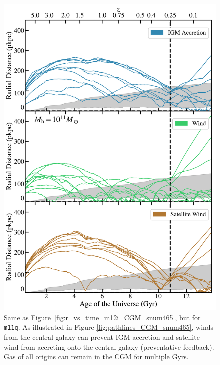 \documentclass[fleqn,usenatbib]{mnras}
\begin{document}
\begin{figure}
\includegraphics[width=\columnwidth]{figures/r_vs_time_m11q_CGM_snum465_galdefv3.pdf}
\caption{
Same as Figure~\ref{fig:r_vs_time_m12i_CGM_snum465}, but for \texttt{m11q}.
As illustrated in Figure \ref{fig:pathlines_CGM_snum465}, winds from the central galaxy can prevent IGM accretion and satellite wind from accreting onto the central galaxy (preventative feedback). 
Gas of all origins can remain in the CGM for multiple Gyrs.
}
\label{fig:r_vs_time_m11q_CGM_snum465}
\end{figure}
\end{document}
